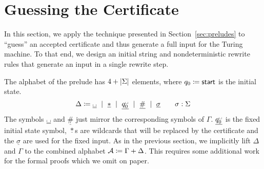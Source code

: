 
\section{Guessing the Certificate}
In this section, we apply the technique presented in Section~\ref{sec:preludes} to ``guess'' an accepted certificate and thus generate a full input for the Turing machine. To that end, we design an initial string and nondeterministic rewrite rules that generate an input in a single rewrite step.

\newcommand{\nblank}{\ensuremath{\underline{\blank}}}
\newcommand{\ndelim}{\ensuremath{\underline{\#}}}
\newcommand{\nstar}{\ensuremath{\underline{*}}}
\newcommand{\ninit}{\ensuremath{\underline{q_0^{\blank}}}}
\newcommand{\nsig}[1]{\ensuremath{\underline{#1}}}

\newcommand{\initStr}{\textsf{initStr}}
\newcommand{\Rprelude}{\ensuremath{R_{\text{prelude}}}}

The alphabet \mnotec[preludeSig']{$\Delta$} of the prelude has $4 + |\Sigma|$ elements, where $q_0 \coloneqq \textsf{start}$ is the initial state.
\[\Delta \defeq \nblank \bnfmid \nstar \bnfmid \ninit \bnfmid \ndelim \bnfmid \nsig{\sigma} \qquad \sigma : \Sigma\]
The symbols $\nblank$ and $\ndelim$ just mirror the corresponding symbols of $\Gamma$. $\ninit$ is the fixed initial state symbol, $\nstar$s are wildcards that will be replaced by the certificate and the $\nsig{\sigma}$ are used for the fixed input. 
As in the previous section, we implicitly lift $\Delta$ and $\Gamma$ to the combined alphabet $\mathcal{A}\coloneqq \Gamma + \Delta$. This requires some additional work for the formal proofs which we omit on paper.

